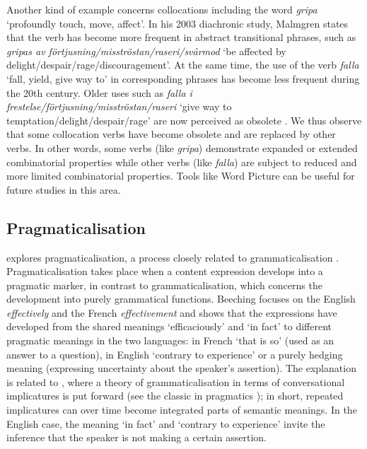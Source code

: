 \documentclass[output=paper]{langscibook}
\begin{document}
\begin{sloppypar}
Another kind of example concerns collocations including the word \emph{gripa} `profoundly touch, move, affect'. In his 2003 diachronic study, Malmgren states that the verb has become more frequent in abstract transitional phrases, such as \emph{gripas av förtjusning\slash misströstan\slash raseri\slash svårmod} `be affected by delight\slash despair\slash rage\slash discouragement'. At the same time, the use of the verb \emph{falla} `fall, yield, give way to' in corresponding phrases has become less frequent during the 20th century. Older uses such as \emph{falla i frestelse/förtjusning/misströstan/raseri} `give way to temptation/delight/despair/rage' are now perceived as obsolete \citep[140--141]{malmgren2003}. We thus observe that some collocation verbs have become obsolete and are replaced by other verbs. In other words, some verbs (like \emph{gripa}) demonstrate expanded or extended combinatorial properties while other verbs (like \emph{falla}) are subject to reduced and more limited combinatorial properties. Tools like Word Picture can be useful for future studies in this area. 
\end{sloppypar}

\subsection{Pragmaticalisation}\largerpage
\citet{beeching2010} explores pragmaticalisation, a process closely related to grammaticalisation \citep{traugott2001regularity}. Pragmaticalisation takes place when a content expression develops into a pragmatic marker, in contrast to grammaticalisation, which concerns the development into purely grammatical functions. Beeching focuses on the English \emph{effectively} and the French \emph{effectivement} and shows that the expressions have developed from the shared meanings `efficaciously' and `in fact' to different pragmatic meanings in the two languages: in French `that is so' (used as an answer to a question), in English `contrary to experience' or a purely hedging meaning (expressing uncertainty about the speaker's assertion). The explanation is related to \citet{traugott2001regularity}, where a theory of grammaticalisation in terms of conversational implicatures is put forward (see the classic in pragmatics \citealt{grice1975}); in short, repeated implicatures can over time become integrated parts of semantic meanings.  In the English case, the meaning `in fact' and `contrary to experience' invite the inference that the speaker is not making a certain assertion. 
\end{document}
